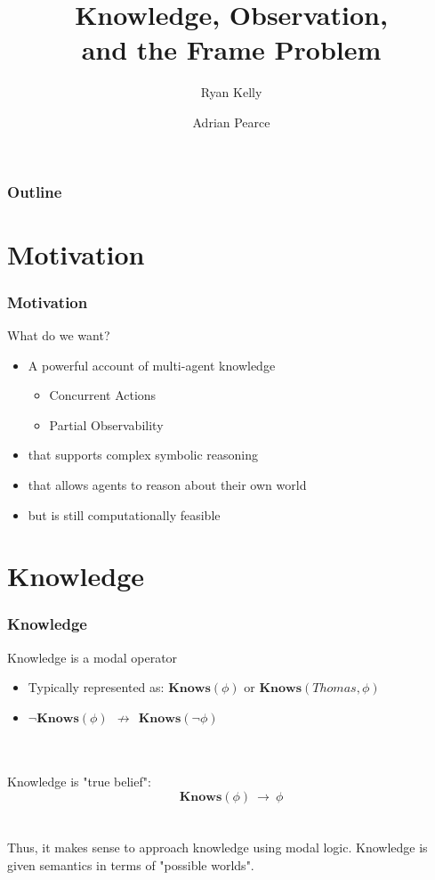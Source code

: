 \documentclass{beamer}
\title{Knowledge, Observation,\\ and the Frame Problem}
\author[Ryan Kelly (rfk@csse.unimelb.edu.au)]{Ryan Kelly \and Adrian Pearce}
\begin{document}
\begin{frame}
  \titlepage
\end{frame}

\begin{frame}
  \frametitle{Outline}
  \tableofcontents
\end{frame}

\section{Motivation}

\begin{frame}
\frametitle{Motivation}
What do we want?
\begin{itemize}
\item A powerful account of multi-agent knowledge
  \begin{itemize}
  \item Concurrent Actions
  \item Partial Observability
  \end{itemize}
\item that supports complex symbolic reasoning
\item that allows agents to reason about their own world
\item but is still computationally feasible
\end{itemize}
\end{frame}


\section{Knowledge}

\begin{frame}
\frametitle{Knowledge}

Knowledge is a modal operator
\begin{itemize}
\item Typically represented as: $\mathbf{Knows}(\phi)$ or $\mathbf{Knows}(Thomas,\phi)$
\item $\neg\mathbf{Knows}(\phi)\ \ \not\rightarrow\ \ \mathbf{Knows}(\neg\phi)$
\end{itemize}
\ \\
\ \\
Knowledge is "true belief":
\[ \mathbf{Knows}(\phi)\ \rightarrow\ \phi \]
\ \\
\ \\
Thus, it makes sense to approach knowledge using modal logic.
Knowledge is given semantics in terms of "possible worlds".

\end{frame}
\end{document}
